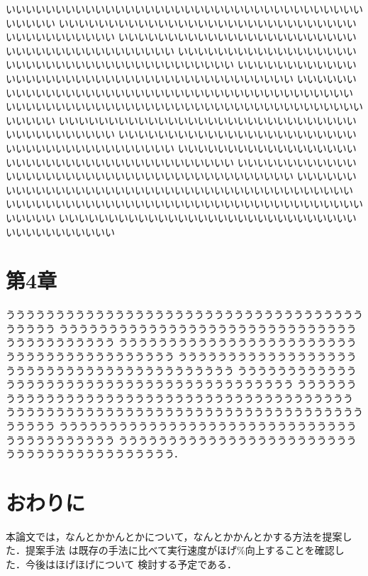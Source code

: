 \documentclass[a4paper,10pt,twocolumn]{jarticle}
\begin{document}
いいいいいいいいいいいいいいいいいいいいいいいいいいいいいいいいいいいいいいいいい
いいいいいいいいいいいいいいいいいいいいいいいいいいいいいいいいいいいいいいいいい
いいいいいいいいいいいいいいいいいいいいいいいいいいいいいいいいいいいいいいいいい
いいいいいいいいいいいいいいいいいいいいいいいいいいいいいいいいいいいいいいいいい
いいいいいいいいいいいいいいいいいいいいいいいいいいいいいいいいいいいいいいいいい
いいいいいいいいいいいいいいいいいいいいいいいいいいいいいいいいいいいいいいいいい
いいいいいいいいいいいいいいいいいいいいいいいいいいいいいいいいいいいいいいいいい
いいいいいいいいいいいいいいいいいいいいいいいいいいいいいいいいいいいいいいいいい
いいいいいいいいいいいいいいいいいいいいいいいいいいいいいいいいいいいいいいいいい
いいいいいいいいいいいいいいいいいいいいいいいいいいいいいいいいいいいいいいいいい
いいいいいいいいいいいいいいいいいいいいいいいいいいいいいいいいいいいいいいいいい
いいいいいいいいいいいいいいいいいいいいいいいいいいいいいいいいいいいいいいいいい
いいいいいいいいいいいいいいいいいいいいいいいいいいいいいいいいいいいいいいいいい
いいいいいいいいいいいいいいいいいいいいいいいいいいいいいいいいいいいいいいいいい
\section{第4章}\label{forth}
ううううううううううううううううううううううううううううううううううううううううう
ううううううううううううううううううううううううううううううううううううううううう
ううううううううううううううううううううううううううううううううううううううううう
ううううううううううううううううううううううううううううううううううううううううう
ううううううううううううううううううううううううううううううううううううううううう
ううううううううううううううううううううううううううううううううううううううううう
ううううううううううううううううううううううううううううううううううううううううう
ううううううううううううううううううううううううううううううううううううううううう
ううううううううううううううううううううううううううううううううううううううううう．

\section{おわりに} \label{fifth}
本論文では，なんとかかんとかについて，なんとかかんとかする方法を提案した．提案手法
は既存の手法に比べて実行速度がほげ\%向上することを確認した．今後はほげほげについて
検討する予定である．

\setlength\baselineskip{12pt}
{\small
	
	
}

\end{document}
